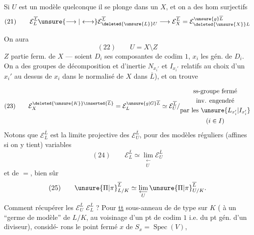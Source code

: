 
Si $U$ est un modèle quelconque\unsure{,|;} il se plonge dans un $X$, et on a des hom surjectifs
\[
(21)\qquad \mathcal E_L^{\overline L}\unsure{\longrightarrow|\longleftrightarrow}\mathcal E_{\deleted{\unsure{L}}U}^{\overline L}\longrightarrow\mathcal E_X^{\overline L}=\mathcal E_{\deleted{\unsure{X}}L}^{\unsure{g}\overline L}
\]

On aura 
\[
(22)\qquad U=X\setminus Z
\]
$Z$ partie ferm. de $X$ --- soient $D_i$ ses composantes de codim $1$, $x_i$ les  gén. de $D_i$. On a des groupes de décomposition et d'inertie $N_{x_i'}$ et $I_{x_i'}$   relatifs au choix d'un $x_i'$ au dessus de $x_i$ dans le normalisé de $X$ dans $\overline L$), et on trouve


\[
(23)\qquad
\mathcal E_X^{\deleted{\unsure{K}}\inserted{\overline L}}
=\mathcal E_L^{\unsure{g|G}\overline L}
\simeq\mathcal E_U^{\overline L}/\begin{gathered}\text{ss-groupe fermé}\\\text{inv. engendré}\\\text{par les }\unsure{L_{x_i'}|I_{x_i'}}\\(i\in I)\end{gathered}
\]
Notons que $\mathcal E_L^{\overline L}$ est la limite
projective des $\mathcal E_U^{\overline L}$, pour des
modèles réguliers (affines si on y tient)
variables
\[
(24)\qquad\mathcal E_L^{\overline L}\simeq\lim_{\substack{\longleftarrow\\U}}\mathcal E_U^{\overline L}
\]
et de $=$, bien sûr
\[
(25)\qquad\unsure{\Pi|\pi}_{L/K}^{\overline L}\simeq\lim_{\substack{\longleftarrow\\U}}\unsure{\Pi|\pi}_{U/K}^{\overline L}.
\]
Comment récupérer les $\mathcal E_U^{\overline L}$ 
$\mathcal E_L^{\overline L}$ ? Pour \uline{tt}
sous-anneau  de  de type
 sur $K$ ( à un
``germe de modèle'' de $L/K$, au
voisinage d'un pt de codim $1$ i.e.
du pt gén. d'un diviseur), considé-\newline
rons le point fermé $x$ de $S_x=\operatorname{Spec}(V)$,

